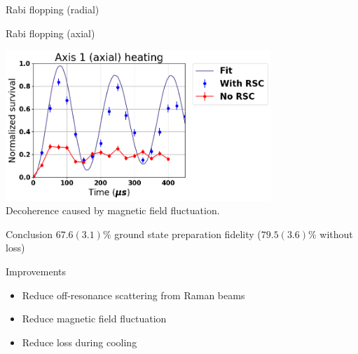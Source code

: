 \documentclass{beamer}
\begin{document}
\begin{frame}{Rabi flopping (radial)}
  \begin{center}
  \end{center}
\end{frame}

\begin{frame}{Rabi flopping (axial)}
  \begin{center}
    \includegraphics[width=10cm]{../../experiments/rabi_flop/imgs/fit_20170409_a1_p1_ba.png}\\
    Decoherence caused by magnetic field fluctuation.
  \end{center}
\end{frame}

\begin{frame}{}
  \begin{block}{Conclusion}
    $67.6(3.1)\%$ ground state preparation fidelity {\small ($79.5(3.6)\%$ without loss)}
  \end{block}
  \vspace{1cm}
  \begin{block}{Improvements}
    \begin{itemize}
    \item Reduce off-resonance scattering from Raman beams
    \item Reduce magnetic field fluctuation
    \item Reduce loss during cooling
    \end{itemize}
  \end{block}
\end{frame}
\end{document}
